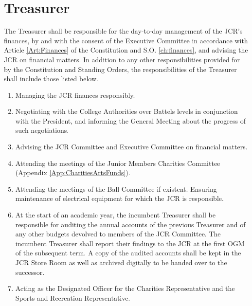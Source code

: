 \section{Treasurer}
\npara The Treasurer shall be responsible for the day-to-day management of the JCR's finances, by and with the consent of the Executive Committee in accordance with Article \ref{Art:Finances} of the Constitution and S.O. \ref{ch:finances}, and advising the JCR on financial matters.
\npara In addition to any other responsibilities provided for by the Constitution and Standing Orders, the responsibilities of the Treasurer shall include those listed below.
\begin{enumerate}
	\item Managing the JCR finances responsibly.     
	\item Negotiating with the College Authorities over Battels levels in conjunction with the President, and informing the General Meeting about the progress of such negotiations.
	\item Advising the JCR Committee and Executive Committee on financial matters.
	\item Attending the meetings of the Junior Members Charities Committee (Appendix \ref{App:CharitiesArtsFunds}).          
	\item Attending the meetings of the Ball Committee if existent.
	Ensuring maintenance of electrical equipment for which the JCR is responsible.     
	\item At the start of an academic year, the incumbent Treasurer shall be responsible for auditing the annual accounts of the previous Treasurer and of any other budgets devolved to members of the JCR Committee.
	The incumbent Treasurer shall report their findings to the JCR at the first OGM of the subsequent term.
	A copy of the audited accounts shall be kept in the JCR Store Room as well as archived digitally to be handed over to the successor.
	\item Acting as the Designated Officer for the Charities Representative and the Sports and Recreation Representative.
\end{enumerate}
